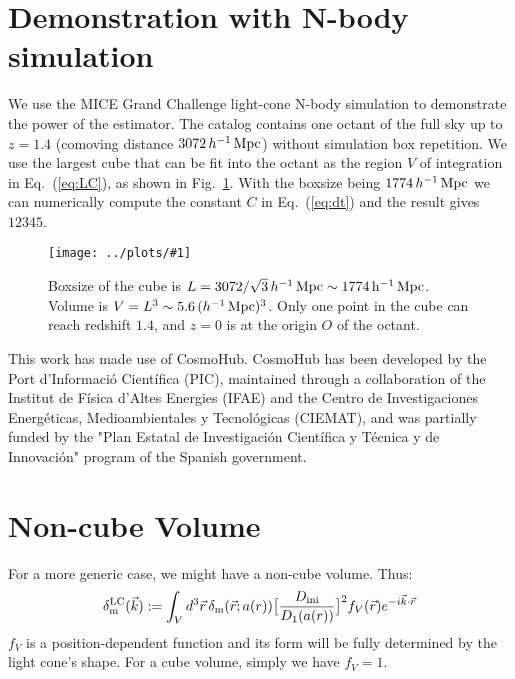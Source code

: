 \documentclass[prd,amsmath,amssymb,floatfix,superscriptaddress,nofootinbib,twocolumn]{revtex4-1}
\def\be{\begin{equation}}
\def\ee{\end{equation}}
\newcommand{\LC}{\rm LC}
\newcommand{\ini}{\rm ini}
\newcommand{\vrr}{\vec{r}}
\newcommand{\vk}{\vec{k}}
\newcommand{\ec}[1]{Eq.~(\ref{eq:#1})}
\newcommand{\rf}[1]{\ref{fig:#1}}
\newcommand{\sfig}[2]{
\texttt{[image: ../plots/\#1]}
        }
\newcommand{\Sfig}[2]{
   \begin{figure}[thbp]
   \begin{center}
    \sfig{../plots/#1.pdf}{\columnwidth}
    \caption{{\small #2}}
    \label{fig:#1}
     \end{center}
   \end{figure}
}
\begin{document}
\section{Demonstration with N-body simulation}
We use the MICE Grand Challenge light-cone N-body simulation \cite{Fosalba:2015MI}\cite{Fosalba:2015MII} to demonstrate the power of the estimator. The catalog contains one octant of the full sky up to $z = 1.4$ (comoving distance $3072\, h^{-1}\, \rm Mpc$) without simulation box repetition. We use the largest cube that can be fit into the octant as the region $V$ of integration in \ec{LC}, as shown in Fig.~\rf{Cube}. With the boxsize being $1774\, h^{-1}\, \rm Mpc$ we can numerically compute the constant $C$ in \ec{dt} and the result gives $12345$.
\Sfig{Cube}{Boxsize of the cube is $L=3072/\sqrt{3}\, h^{-1}\, \rm Mpc\sim 1774\, h^{-1}\, \rm Mpc$. Volume is $V=L^3\sim 5.6\,(h^{-1}\,\rm Mpc)^3$. Only one point in the cube can reach redshift $1.4$, and $z=0$ is at the origin $O$ of the octant.}

\acknowledgements
This work has made use of CosmoHub. CosmoHub has been developed by the Port d'Informació Científica (PIC), maintained through a collaboration of the Institut de Física d'Altes Energies (IFAE) and the Centro de Investigaciones Energéticas, Medioambientales y Tecnológicas (CIEMAT), and was partially funded by the "Plan Estatal de Investigación Científica y Técnica y de Innovación" program of the Spanish government.



\appendix

\section{Non-cube Volume}
For a more generic case, we might have a non-cube volume. Thus:
\be
\delta^{\LC}_{\rm m}(\vk) :=\int_{V} d^3\vrr  \, \delta_{\rm m}(\vrr;a(r))\big[ \frac{D_{\ini}}{D_{1}(a(r))} \big]^{2}f_{V}(\vrr) e^{-i\vk \cdot\vrr}
\ee
 $f_{V}$ is a position-dependent function and its form will be fully determined by the light cone's shape. For a cube volume, simply we have $f_V=1$.
\end{document}
